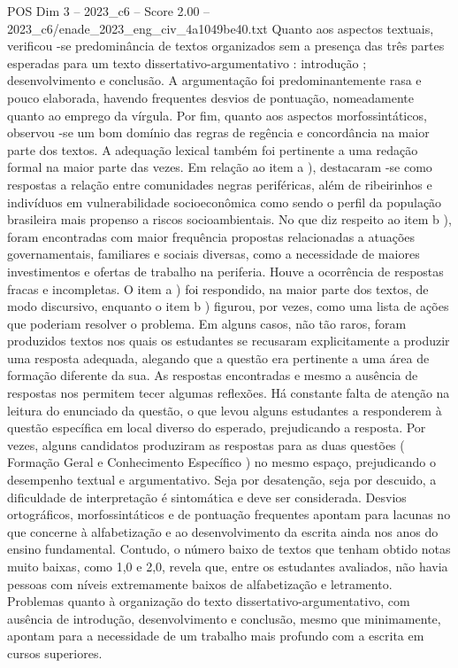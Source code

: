 \begin{textsample}{POS Dim 3 – 2023\_c6 – Score 2.00 – 2023\_c6/enade\_2023\_eng\_civ\_4a1049be40.txt}
Quanto aos aspectos textuais, verificou -se predominância de textos organizados sem a presença das três partes esperadas para um texto dissertativo-argumentativo : introdução ; desenvolvimento e conclusão.
A argumentação foi predominantemente rasa e pouco elaborada, havendo frequentes desvios de pontuação, nomeadamente quanto ao emprego da vírgula.
Por fim, quanto aos aspectos morfossintáticos, observou -se um bom domínio das regras de regência e concordância na maior parte dos textos.
A adequação lexical também foi pertinente a uma redação formal na maior parte das vezes.
Em relação ao item a ), destacaram -se como respostas a relação entre comunidades negras periféricas, além de ribeirinhos e indivíduos em vulnerabilidade socioeconômica como sendo o perfil da população brasileira mais propenso a riscos socioambientais.
No que diz respeito ao item b ), foram encontradas com maior frequência propostas relacionadas a atuações governamentais, familiares e sociais diversas, como a necessidade de maiores investimentos e ofertas de trabalho na periferia.
Houve a ocorrência de respostas fracas e incompletas.
O item a ) foi respondido, na maior parte dos textos, de modo discursivo, enquanto o item b ) figurou, por vezes, como uma lista de ações que poderiam resolver o problema.
Em alguns casos, não tão raros, foram produzidos textos nos quais os estudantes se recusaram explicitamente a produzir uma resposta adequada, alegando que a questão era pertinente a uma área de formação diferente da sua.
As respostas encontradas e mesmo a ausência de respostas nos permitem tecer algumas reflexões.
Há constante falta de atenção na leitura do enunciado da questão, o que levou alguns estudantes a responderem à questão específica em local diverso do esperado, prejudicando a resposta.
Por vezes, alguns candidatos produziram as respostas para as duas questões ( Formação Geral e Conhecimento Específico ) no mesmo espaço, prejudicando o desempenho textual e argumentativo.
Seja por desatenção, seja por descuido, a dificuldade de interpretação é sintomática e deve ser considerada.
Desvios ortográficos, morfossintáticos e de pontuação frequentes apontam para lacunas no que concerne à alfabetização e ao desenvolvimento da escrita ainda nos anos do ensino fundamental.
Contudo, o número baixo de textos que tenham obtido notas muito baixas, como 1,0 e 2,0, revela que, entre os estudantes avaliados, não havia pessoas com níveis extremamente baixos de alfabetização e letramento.
Problemas quanto à organização do texto dissertativo-argumentativo, com ausência de introdução, desenvolvimento e conclusão, mesmo que minimamente, apontam para a necessidade de um trabalho mais profundo com a escrita em cursos superiores.

\end{textsample}
